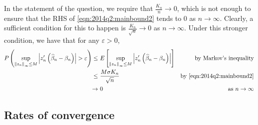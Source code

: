 In the statement of the question, we require that \(\frac{K_{n}}{n} \to 0\),
which is not enough to ensure that the RHS of \eqref{eqn:2014q2:mainbound2}
tends to 0 as \(n \to \infty\). Clearly, a sufficient condition for this to
happen is \(\frac{K_{n}}{\sqrt{n}} \to 0\) as \(n \to \infty\). Under this
stronger condition, we have that for any \(\varepsilon > 0\),
\begin{align*}
  P \left( \sup_{\left\Vert z_{n} \right\Vert_{\infty} \leq M} \left|
  z_{n}^{\prime} \left( \widehat{\beta}_{n} - \beta_{n} \right) \right| >
  \varepsilon \right) \leq & \ E \left[ \sup_{\left\Vert z_{n}
  \right\Vert_{\infty} \leq M} \left| z_{n}^{\prime} \left( \widehat{\beta}_{n}
  - \beta_{n} \right) \right| \right] & \text{by Markov's inequality} \\
  \leq & \ \frac{M \sigma K_{n}}{\sqrt{n}} & \text{by
  \eqref{eqn:2014q2:mainbound2}} \\
  \to & \ 0 & \text{as } n \to \infty
\end{align*}

\subsection{Rates of convergence}

